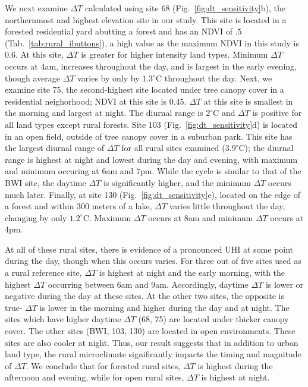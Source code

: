 \documentclass[draft,linenumbers]{agujournal}
\begin{document}
We next examine $\Delta T$ calculated using site 68 (Fig.~\ref{fig:dt_sensitivity}b), the northernmost and highest elevation site in our study. This site is located in a forested residential yard abutting a forest and has an NDVI of $.5$ (Tab.~\ref{tab:rural_ibuttons}), a high value as the maximum NDVI in this study is $0.6$. At this site, $\Delta T$ is greater for higher intensity land types. Minimum $\Delta T$ occurs at 4am, increases throughout the day, and is largest in the early evening, though average $\Delta T$ varies by only by $1.3^\circ$C throughout the day.
Next, we examine site 75, the second-highest site located under tree canopy cover in a residential neighorhood; NDVI at this site is 0.45. $\Delta T$ at this site is smallest in the morning and largest at night. The diurnal range is $2^\circ$C and $\Delta T$ is positive for all land types except rural forests. 
Site 103 (Fig.~\ref{fig:dt_sensitivity}d) is located in an open field, outside of tree canopy cover in a suburban park.  
This site has the largest diurnal range of $\Delta T$ for all rural sites examined ($3.9^\circ$C); the diurnal range is highest at night and lowest during the day and evening, with maximum and minimum occuring at 6am and 7pm.
While the cycle is similar to that of the BWI site, the daytime $\Delta T$ is significantly higher, and the minimum $\Delta T$ occurs much later. 
Finally, at site 130  (Fig.~\ref{fig:dt_sensitivity}e), located on the edge of a forest and within 300 meters of a lake, $\Delta T$ varies little throughout the day, changing by only $1.2^\circ$C. Maximum $\Delta T$ occurs at 8am and minimum $\Delta T$ occurs at 4pm. 

At all of these rural sites, there is evidence of a pronounced UHI at some point during the day, though when this occurs varies.
 For three out of five sites used as a rural reference site, $\Delta T$ is highest at night and the early morning, with the highest $\Delta T$ occurring between 6am and
9am.  
Accordingly, daytime $\Delta T$ is lower or negative during the day at these sites. 
At the other two sites, the opposite is true- $\Delta T$ is lower in the morning and higher during the day and at night. 
The sites which have higher daytime $\Delta T$ (68, 75) are located under thicker canopy cover. The other sites (BWI, 103, 130) are located in open environments. These sites are also cooler at night. 
Thus, our result suggests that in addition to urban land type, the rural microclimate significantly impacts the timing and magnitude of $ \Delta T$. We conclude that for forested rural sites, $\Delta T$ is highest during the afternoon and evening, while for open rural sites, $\Delta T$ is highest at night. 
\end{document}
